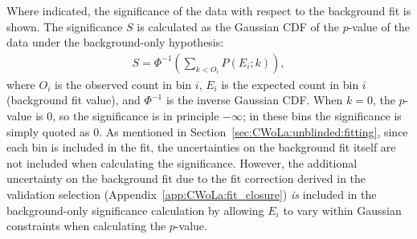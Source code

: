 Where indicated, the significance of the data with respect to the background fit is shown.
The significance $S$ is calculated as the Gaussian CDF of the $p$-value of the data under the background-only hypothesis:
\begin{align}
  S = \Phi^{-1}\left(\sum_{k<O_i} P(E_i;k)\right),
  \label{eqn:CWoLa:significance_def}
\end{align}
where $O_i$ is the observed count in bin $i$, $E_i$ is the expected count in bin $i$ (background fit value), and $\Phi^{-1}$ is the inverse Gaussian CDF.
When $k=0$, the $p$-value is $0$, so the significance is in principle $-\infty$; in these bins the significance is simply quoted as $0$.
As mentioned in Section~\ref{sec:CWoLa:unblinded:fitting}, since each bin is included in the fit, the uncertainties on the background fit itself are not included when calculating the significance.
However, the additional uncertainty on the background fit due to the fit correction derived in the validation selection (Appendix~\ref{app:CWoLa:fit_closure}) \textit{is} included in the background-only significance calculation by allowing $E_i$ to vary within Gaussian constraints when calculating the $p$-value.


